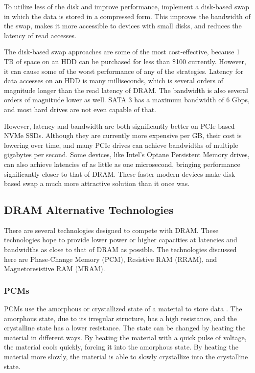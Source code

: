 \documentclass[doublespace,nopageskip]{VTthesis}
\begin{document}
To utilize less of the disk and improve performance, \cite{diskswapcompression, resurrectswapcompression} implement a disk-based swap in which the data is stored in a compressed form. This improves the bandwidth of the swap, makes it more accessible to devices with small disks, and reduces the latency of read accesses.

The disk-based swap approaches are some of the most cost-effective, because 1 TB of space on an HDD can be purchased for less than \$100 currently. However, it can cause some of the worst performance of any of the strategies. Latency for data accesses on an HDD is many milliseconds, which is several orders of magnitude longer than the read latency of DRAM. The bandwidth is also several orders of magnitude lower as well. SATA 3 has a maximum bandwidth of 6 Gbps, and most hard drives are not even capable of that.

However, latency and bandwidth are both significantly better on PCIe-based NVMe SSDs. Although they are currently more expensive per GB, their cost is lowering over time, and many PCIe drives can achieve bandwidths of multiple gigabytes per second. Some devices, like Intel's Optane Persistent Memory drives, can also achieve latencies of as little as one microsecond, bringing performance significantly closer to that of DRAM. These faster modern devices make disk-based swap a much more attractive solution than it once was.

\subsection{DRAM Alternative Technologies}\label{ss:dram_alternative_technologies}
There are several technologies designed to compete with DRAM. These technologies hope to provide lower power or higher capacities at latencies and bandwidths as close to that of DRAM as possible. The technologies discussed here are Phase-Change Memory (PCM), Resistive RAM (RRAM), and Magnetoresistive RAM (MRAM).

\subsubsection{PCMs}\label{sss:pcms}
PCMs use the amorphous or crystallized state of a material to store data \cite{pcm1, pcm2}. The amorphous state, due to its irregular structure, has a high resistance, and the crystalline state has a lower resistance. The state can be changed by heating the material in different ways. By heating the material with a quick pulse of voltage, the material cools quickly, forcing it into the amorphous state. By heating the material more slowly, the material is able to slowly crystallize into the crystalline state.
\end{document}
